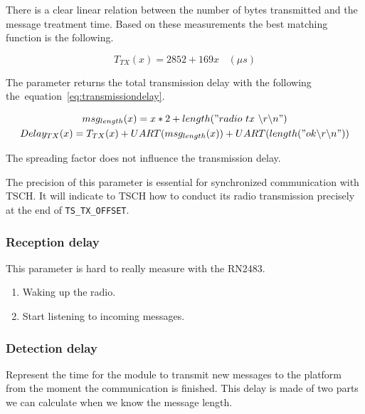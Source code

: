 There is a clear linear relation between the number of bytes transmitted and
the message treatment time.
Based on these measurements the best matching function is the following.

\begin{equation}
  \label{eq:transmissioncompute}
  T_{TX}(x) = 2852 + 169x \ \ \ \ (\mu s)
\end{equation}

The parameter returns the total transmission delay with the following
the~equation~\ref{eq:transmissiondelay}.

\begin{gather}
  \label{eq:transmissiondelay}
  msg_{length}(x) = x * 2 + length("radio~tx~\backslash r \backslash n") \\
  Delay_{TX}(x) = T_{TX}(x) + UART(msg_{length}(x)) + UART(length("ok \backslash r\backslash n"))
\end{gather}

The spreading factor does not influence the transmission delay.

The precision of this parameter is essential for synchronized communication
with TSCH. It will indicate to TSCH how to conduct its radio transmission
precisely at the end of \lstinline{TS_TX_OFFSET}.

\subsubsection{Reception delay}

This parameter is hard to really measure with the RN2483.

\begin{enumerate}
  \item Waking up the radio.
  \item Start listening to incoming messages.
\end{enumerate}

\subsubsection{Detection delay}


Represent the time for the module to transmit new messages to the platform
from the moment the communication is finished.
This delay is made of two parts we can calculate when we know the message
length.

